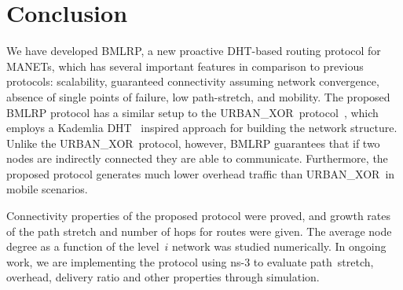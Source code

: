 \documentclass[conference]{IEEEtran}
\theoremstyle{definition}
\newcommand{\urbanxor}{URBAN\_XOR}
\begin{document}
\section{Conclusion}
\label{sec:conclusion}

We have developed BMLRP, a new proactive DHT-based routing protocol for MANETs, which has several important features in comparison to previous protocols: scalability, guaranteed connectivity assuming network convergence,  absence of single points of failure, low path-stretch, and mobility. The proposed BMLRP protocol has a similar setup to the \urbanxor\ protocol~\cite{Pasquini}, which employs a Kademlia DHT~\cite{kademlia} inspired approach for building the network structure. Unlike the \urbanxor\ protocol, however, BMLRP guarantees that if two nodes are indirectly connected they are able to communicate. Furthermore, the proposed protocol generates much lower overhead traffic than \urbanxor\ in mobile scenarios.  

Connectivity properties of the proposed protocol were proved, and growth rates of the path stretch and number of hops for routes were given. The average node degree as a function of the level~$i$ network was studied numerically. In ongoing work, we are implementing the protocol using ns-3 to evaluate path~stretch, overhead, delivery ratio and other properties through simulation.




\end{document}

